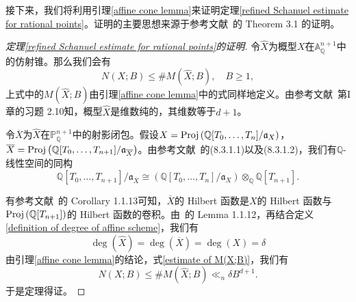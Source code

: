接下来，我们将利用引理\ref{affine cone lemma}来证明定理\ref{refined Schanuel estimate for rational points}。证明的主要思想来源于参考文献~的 Theorem 3.1 的证明。

\begin{proof} [定理\ref{refined Schanuel estimate for rational points}的证明]
令$\hat{X}$为概型$X$在$\mathbb{A}^{n+1}_{\mathbb{Q}}$中的仿射锥。那么我们会有
\begin{equation}
N(X;B) \leqslant \#M(\hat{X};B), \quad B \geqslant 1,
\end{equation}
上式中的$M(\hat{X};B)$由引理\ref{affine cone lemma}中的式\label{M(X;B)}同样地定义。由参考文献~第I章的习题 2.10知，概型$\hat{X}$是维数纯的，其维数等于$d+1$。

令$\overline{X}$为$\hat{X}$在$\mathbb{P}^{n+1}_{\mathbb{Q}}$中的射影闭包。假设$X = \operatorname{Proj} \left( \mathbb{Q}[T_0,\ldots,T_n]/\mathfrak{a}_X \right)$，$\overline{X} = \operatorname{Proj} \left( \mathbb{Q}[T_0,\ldots,T_{n+1}]/\mathfrak{a}_{\overline{X}} \right)$。由参考文献~的(8.3.1.1)以及(8.3.1.2)，我们有$\mathbb{Q}$-线性空间的同构
\begin{equation}
\mathbb{Q}[T_0,\ldots,T_{n+1}]/\mathfrak{a}_{\overline{X}} \cong \left( \mathbb{Q}[T_0,\ldots,T_n]/\mathfrak{a}_X \right) \otimes_{\mathbb{Q}} \mathbb{Q}[T_{n+1}].
\end{equation}

有参考文献~的 Corollary 1.1.13可知，$\overline{X}$的 Hilbert 函数是$X$的 Hilbert 函数与$\operatorname{Proj} \left( \mathbb{Q}[T_{n+1}] \right)$的 Hilbert 函数的卷积。由~的 Lemma 1.1.12，再结合定义\ref{definition of degree of affine scheme}，我们有
\begin{equation}
\deg(\hat{X})=\deg(\overline{X}) = \deg(X) = \delta
\end{equation}
由引理\ref{affine cone lemma}的结论，式\eqref{estimate of M(X;B)}，我们有
\begin{equation}
N(X;B) \leqslant \#M(\hat{X};B) \ll_{n} \delta B^{d+1}.
\end{equation}
于是定理得证。
\end{proof}


